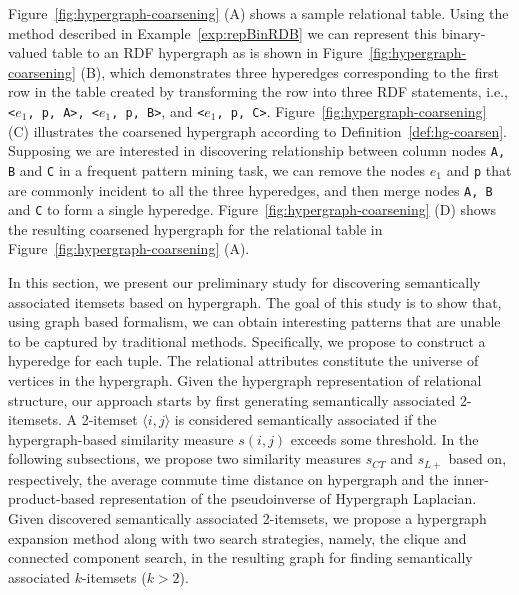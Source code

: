 \begin{myexp}
\label{column-wise-hg}
Figure~\ref{fig:hypergraph-coarsening} (A) shows a sample relational table. Using the method described in Example~\ref{exp:repBinRDB} we can represent this binary-valued table to an RDF hypergraph as is shown in Figure~\ref{fig:hypergraph-coarsening} (B), which demonstrates three hyperedges corresponding to the first row in the table created by transforming the row into three RDF statements, i.e., \texttt{<$e_1$, p, A>, <$e_1$, p, B>}, and \texttt{<$e_1$, p, C>}. Figure~\ref{fig:hypergraph-coarsening} (C) illustrates the coarsened hypergraph according to Definition~\ref{def:hg-coarsen}. Supposing we are interested in discovering relationship between column nodes \texttt{A, B} and \texttt{C} in a frequent pattern mining task, we can remove the nodes \texttt{$e_1$} and \texttt{p} that are commonly incident to all the three hyperedges, and then merge nodes \texttt{A, B} and \texttt{C} to form a single hyperedge. Figure~\ref{fig:hypergraph-coarsening} (D) shows the resulting coarsened hypergraph for the relational table in Figure~\ref{fig:hypergraph-coarsening} (A).  
\end{myexp}

In this section, we present our preliminary study for discovering semantically associated itemsets based on hypergraph. The goal of this study is to show that, using graph based formalism, we can obtain interesting patterns that are unable to be captured by traditional methods. Specifically, we propose to construct a hyperedge for each tuple. The relational attributes constitute the universe of vertices in the hypergraph. Given the hypergraph representation of relational structure, our approach starts by first generating semantically associated 2-itemsets. A 2-itemset $\langle i,j \rangle$ is considered semantically associated if the hypergraph-based similarity measure $s(i,j)$ exceeds some threshold. In the following subsections, we propose two similarity measures $s_{CT}$ and $s_{L+}$ based on, respectively, the average commute time distance on hypergraph and the inner-product-based representation of the pseudoinverse of Hypergraph Laplacian. Given discovered semantically associated 2-itemsets, we propose a hypergraph expansion method along with two search strategies, namely, the clique and connected component search, in the resulting graph for finding semantically associated $k$-itemsets ($k>2$).

